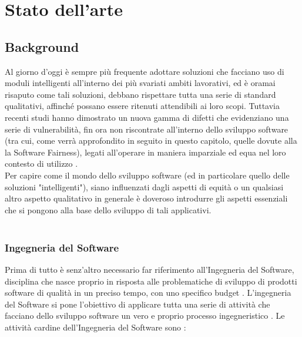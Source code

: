 \chapter{Stato dell'arte} %
%

\section{Background}
Al giorno d'oggi è sempre più frequente adottare soluzioni che facciano uso di moduli intelligenti all'interno dei più svariati ambiti lavorativi, ed è oramai risaputo come tali soluzioni, debbano rispettare tutta una serie di standard qualitativi, affinché possano essere ritenuti attendibili ai loro scopi. Tuttavia recenti studi hanno dimostrato un nuova gamma di difetti che evidenziano una serie di vulnerabilità, fin ora non riscontrate all'interno dello sviluppo software (tra cui, come verrà approfondito in seguito in questo capitolo, quelle dovute alla la Software Fairness), legati all'operare in maniera imparziale ed equa nel loro contesto di utilizzo \cite{brun2018software}.\\

Per capire come il mondo dello sviluppo software (ed in particolare quello delle soluzioni "intelligenti"), siano influenzati dagli aspetti di equità o un qualsiasi altro aspetto qualitativo in generale è doveroso introdurre gli aspetti essenziali che si pongono alla base dello sviluppo di tali applicativi.\\\\

\subsection{Ingegneria del Software}
Prima di tutto è senz'altro necessario far riferimento all'Ingegneria del Software, disciplina che nasce proprio in risposta alle problematiche di sviluppo di prodotti software di qualità in un preciso tempo, con uno specifico budget \cite{Bruegge2009ObjectOrientedSE}. L'ingegneria del Software si pone l'obiettivo di applicare tutta una serie di attività che facciano dello sviluppo software un vero e proprio processo ingegneristico \cite{mall2018fundamentals}. Le attività cardine dell'Ingegneria del Software sono \cite{Bruegge2009ObjectOrientedSE}:

